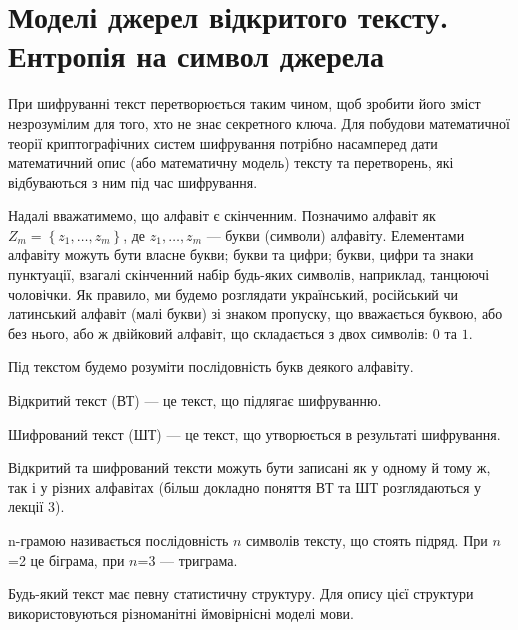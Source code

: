 \chapter{Моделі джерел відкритого тексту. Ентропія на символ джерела}
\label{lecture:2}

При шифруванні текст перетворюється таким чином, щоб зробити його зміст
незрозумілим для того, хто не знає секретного ключа. Для побудови математичної
теорії криптографічних систем шифрування потрібно насамперед дати математичний
опис (або математичну модель) тексту та перетворень, які відбуваються з ним під
час шифрування.

\begin{definition}[Алфавіт]
    Надалі вважатимемо, що алфавіт є скінченним.
    Позначимо алфавіт як $Z_m = \left\{z_1, \dots , z_m \right\}$, де
    $z_1, \dots , z_{m}$ --- букви (символи) алфавіту.
    Елементами алфавіту можуть бути власне букви; букви та цифри;
    букви, цифри та знаки пунктуації, взагалі скінченний набір
    будь-яких символів, наприклад, танцюючі чоловічки.
    Як правило, ми будемо розглядати український,
    російський чи латинський алфавіт (малі букви) зі знаком пропуску,
    що вважається буквою, або без нього, або ж двійковий алфавіт,
    що складається з двох символів: $0$ та $1$. 
\end{definition}
\begin{definition}[Текст]
    Під текстом будемо розуміти послідовність букв деякого алфавіту.
\end{definition}

\begin{definition} Відкритий текст (ВТ) --- це текст,
    що підлягає шифруванню.
\end{definition}
\begin{definition}Шифрований текст (ШТ) --- це текст,
    що утворюється в результаті шифрування.
\end{definition}

Відкритий та шифрований тексти можуть бути записані як у одному й тому ж,
так і у різних алфавітах (більш докладно поняття ВТ та ШТ
розглядаються у лекції 3).

\begin{definition}[n-грама]
n-грамою називається послідовність  $n$ символів тексту, що
стоять підряд. При  ${n}$=2 це біграма, при  ${n}$=3 --- триграма.
\end{definition}

Будь-який текст має певну статистичну структуру. Для опису цієї структури
використовуються різноманітні ймовірнісні моделі мови. 

